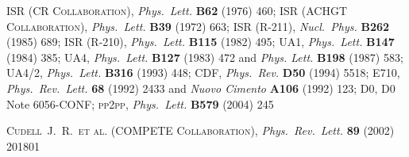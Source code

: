 \documentclass[pdftex,twocolumn,epjc3]{svjour3}
\def\etal{et al.}
\def\Name#1{\textsc{#1}, }
\def\REVIEW#1#2#3#4{{\it #1} {\bf #2} (#3) #4}
\begin{document}

	\Name{ISR (CR Collaboration)} \REVIEW{Phys.~Lett.}{B62}{1976}{460}; 
	\Name{ISR (ACHGT Collaboration)} \REVIEW{Phys.~Lett.}{B39}{1972}{663}; 
	\Name{ISR (R-211)} \REVIEW{Nucl.~Phys.}{B262}{1985}{689}; 
	\Name{ISR (R-210)} \REVIEW{Phys.~Lett.}{B115}{1982}{495}; 
	\Name{UA1} \REVIEW{Phys.~Lett.}{B147}{1984}{385}; 
	\Name{UA4} \REVIEW{Phys.~Lett.}{B127}{1983}{472} and \REVIEW{Phys. Lett.}{B198}{1987}{583}; 
	\Name{UA4/2} \REVIEW{Phys.~Lett.}{B316}{1993}{448}; 
	\Name{CDF} \REVIEW{Phys.~Rev.}{D50}{1994}{5518}; 
	\Name{E710} \REVIEW{Phys.~Rev.~Lett.}{68}{1992}{2433} and \REVIEW{Nuovo Cimento}{A106}{1992}{123}; 
	\Name{D0} D0 Note 6056-CONF; 
	\Name{pp2pp} \REVIEW{Phys.~Lett.}{B579}{2004}{245}

	\Name{Cudell~J.~R.~\etal{} (COMPETE Collaboration)}
	\REVIEW{Phys.\ Rev.\ Lett.}{89}{2002}{201801}

\fi
\end{document}
